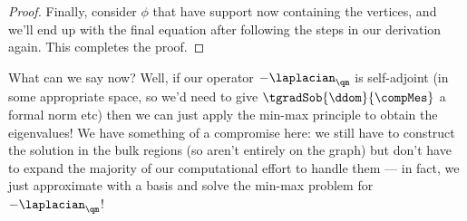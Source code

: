 \documentclass[11pt]{report}
\begin{document}
\begin{proof}
	Finally, consider $\phi$ that have support now containing the vertices, and we'll end up with the final equation after following the steps in our derivation again.
	This completes the proof.
\end{proof}

What can we say now?
Well, if our operator $-\laplacian_{\qm}$ is self-adjoint (in some appropriate space, so we'd need to give $\tgradSob{\ddom}{\compMes}$ a formal norm etc) then we can just apply the min-max principle to obtain the eigenvalues!
We have something of a compromise here: we still have to construct the solution in the bulk regions (so aren't entirely on the graph) but don't have to expand the majority of our computational effort to handle them --- in fact, we just approximate with a basis and solve the min-max problem for $-\laplacian_{\qm}$!
\end{document}
